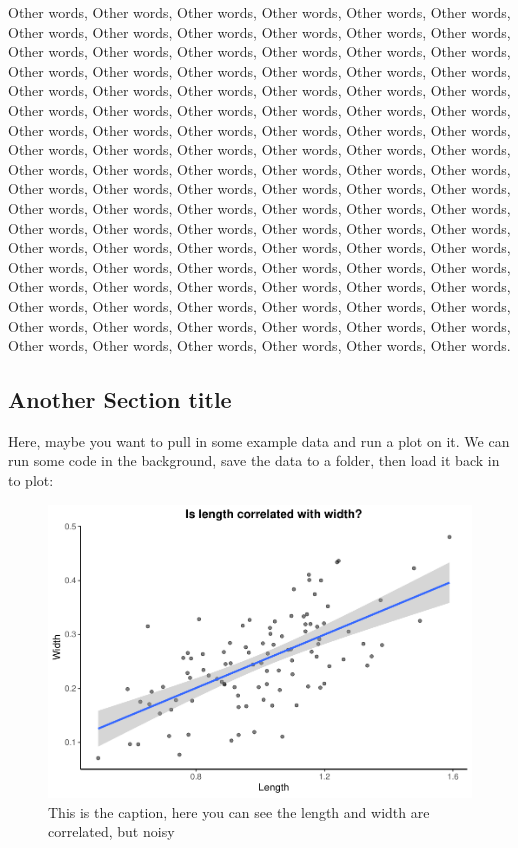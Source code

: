 \documentclass[
  twocolumn]{article}
\begin{document}
Other words, Other words, Other words, Other words, Other words, Other
words, Other words, Other words, Other words, Other words, Other words,
Other words, Other words, Other words, Other words, Other words, Other
words, Other words, Other words, Other words, Other words, Other words,
Other words, Other words, Other words, Other words, Other words, Other
words, Other words, Other words, Other words, Other words, Other words,
Other words, Other words, Other words, Other words, Other words, Other
words, Other words, Other words, Other words, Other words, Other words,
Other words, Other words, Other words, Other words, Other words, Other
words, Other words, Other words, Other words, Other words, Other words,
Other words, Other words, Other words, Other words, Other words, Other
words, Other words, Other words, Other words, Other words, Other words,
Other words, Other words, Other words, Other words, Other words, Other
words, Other words, Other words, Other words, Other words, Other words,
Other words, Other words, Other words, Other words, Other words, Other
words, Other words, Other words, Other words, Other words, Other words,
Other words, Other words, Other words, Other words, Other words, Other
words, Other words, Other words, Other words, Other words, Other words,
Other words, Other words, Other words, Other words, Other words, Other
words, Other words, Other words, Other words.

\hypertarget{another-section-title}{%
\subsection{Another Section title}\label{another-section-title}}

Here, maybe you want to pull in some example data and run a plot on it.
We can run some code in the background, save the data to a folder, then
load it back in to plot:

\begin{figure}
\centering
\includegraphics{2_Col_template_files/figure-latex/unnamed-chunk-2-1.pdf}
\caption{This is the caption, here you can see the length and width are
correlated, but noisy}
\end{figure}
\end{document}
